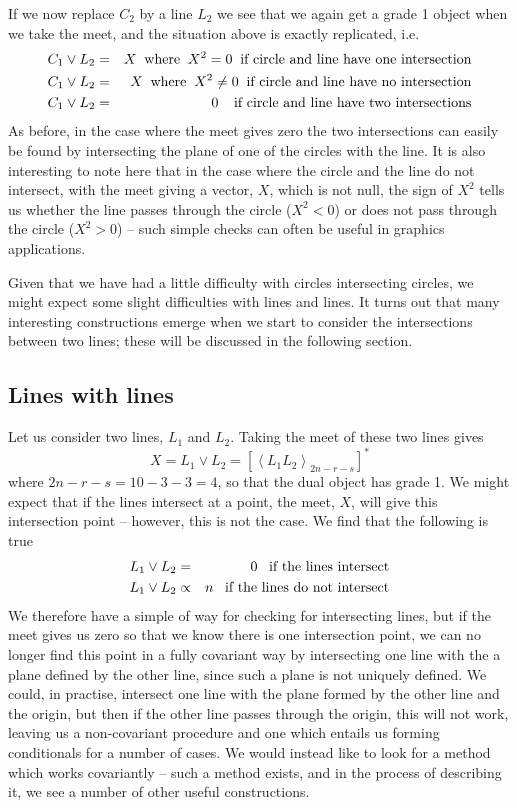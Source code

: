 If we now replace $C_2$ by a line $L_2$ we see that we
again get a grade 1 object when we take the meet, and the
situation above is exactly replicated, i.e.
%
\begin{eqnarray}
C_1 \vee L_2  &  =  &  X \;\;\mbox{where}\;\;
X^2=0\;\;\mbox{if circle and line have one intersection} \nonumber \\
C_1 \vee L_2  &  =  &  X \;\;\mbox{where}\;\;
X^2\ne 0\;\;\mbox{if circle and line have no intersection} \nonumber \\
C_1 \vee L_2  &  =  &  0 \;\; \;\;\mbox{if circle and
line have two intersections}
\end{eqnarray}
%
As before, in the case where the meet gives zero the two
intersections can easily be found by intersecting the
plane of one of the circles with the line. It is also
interesting to note here that in the case where the
circle and the line do not intersect, with the meet
giving a vector, $X$, which is not null, the sign of
$X^2$ tells us whether the line passes through the circle
($X^2<0$) or does not pass through the circle ($X^2>0$)
-- such simple checks can often be useful in graphics
applications.


Given that we have had a little difficulty with circles
intersecting circles, we might expect some slight
difficulties with lines and lines. It turns out that many
interesting constructions emerge when we start to
consider the intersections between two lines; these will
be discussed in the following section.


\subsection{Lines with lines }

Let us consider two lines, $L_1$ and $L_2$. Taking the
meet of these two lines gives
%
\begin{equation}
X = L_1 \vee L_2 = \left[\left< L_1 L_2
\right>_{2n-r-s}\right]^*
\end{equation}
%
where $2n-r-s=10-3-3=4$, so that the dual object has
grade 1. We might expect that if the lines intersect at a
point, the meet, $X$, will give this intersection point
-- however, this is not the case. We find that the
following is true
%
\begin{eqnarray}
L_1 \vee L_2 & = & 0 \;\;\; \mbox{if the lines intersect}
\nonumber \\
L_1 \vee L_2 & \propto & n \;\;\; \mbox{if the lines do
not intersect}
\end{eqnarray}
%
We therefore have a simple of way for checking for
intersecting lines, but if the meet gives us zero so that
we know there is one intersection point, we can no longer
find this point in a fully covariant way by intersecting
one line with the a plane defined by the other line,
since such a plane is not uniquely defined. We could, in
practise, intersect one line with the plane formed by the
other line and the origin, but then if the other line
passes through the origin, this will not work, leaving us
a non-covariant procedure and one which entails
us forming conditionals for a number of cases. We would
instead like to look for a method which works covariantly
-- such a method exists, and in the process of describing
it, we see a number of other useful constructions.

